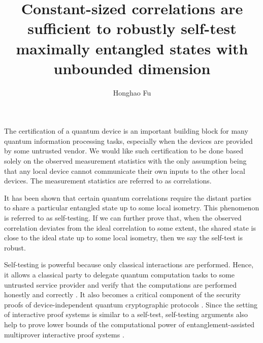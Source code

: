 \documentclass[11pt,letterpaper]{article}
\date{}
\newcommand{\1}{\mathbb{1}}
\theoremstyle{definition}
\begin{document}
\title{Constant-sized correlations are sufficient to 
robustly self-test maximally entangled states with unbounded dimension}

\author{Honghao Fu}

\maketitle

The certification of a quantum device is an important building block
for many quantum information processing tasks, especially
when the devices are provided by some untrusted vendor.
We would like such certification to be done based solely on
the observed measurement statistics with the only assumption being that
any local device cannot communicate their own
inputs to the other local devices. 
The measurement statistics are referred to as correlations.

It has been shown that certain quantum correlations require the distant parties to share
a particular entangled state up to some local isometry. 
This phenomenon is referred to as self-testing.  
If we can further prove that, when the observed correlation deviates from 
the ideal correlation to some extent, 
the shared state is close to the ideal state up to some local isometry,
then we say the self-test is robust. 

Self-testing is powerful because only classical interactions are performed.
Hence, it allows a classical party to delegate quantum computation tasks to some untrusted service provider
and verify that the computations are performed
honestly and correctly \cite{ruv2013,coladan2017verifier}.
It also becomes a critical component of the security proofs of device-independent quantum cryptographic protocols
\cite{mayersyao,vv2014,miller2017,fu2018,eat2018}.
Since the setting of interactive proof systems is similar to a self-test, self-testing arguments also help to prove
lower bounds of the computational power of entanglement-assisted
multiprover interactive proof systems \cite{fitzsimons2019, neexp}.
\end{document}

